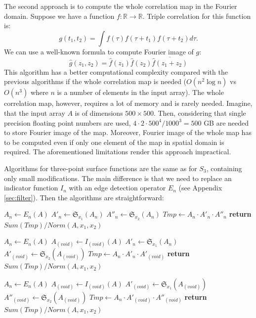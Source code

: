 \documentclass[reprint,amsmath,amssymb,aps,pre,showkeys,showpacs]{revtex4-1}
\begin{document}
The second approach is to compute the whole correlation map in the Fourier
domain. Suppose we have a function
$f: \mathbb{R} \rightarrow \mathbb{R}$. Triple correlation for this function is:
\begin{equation}
  g(t_1, t_2) = \int f(\tau) f(\tau + t_1) f(\tau + t_2) d \tau.
\end{equation}
We can use a well-known formula to compute Fourier image of $g$:
\begin{equation}
  \hat{g}(z_1, z_2) = \hat{f}(z_1) \hat{f}(z_2) \overline{\hat{f}(z_1 + z_2)}
\end{equation}
This algorithm has a better computational complexity compared with the previous
algorithms if the whole correlation map is needed ($O(n^2 \log n)$ vs
$O(n^3)$ where $n$ is a number of elements in the input array). The whole
correlation map, however, requires a lot of memory and is rarely
needed. Imagine, that the input array $A$ is of dimensions $500 \times 500$.
Then, considering that single precision floating point numbers are used,
$4 \cdot 2 \cdot 500^4 / 1000^3 = 500$ GB are needed to store Fourier image of
the map. Moreover, Fourier image of the whole map has to be computed even if only one
element of the map in spatial domain is required. The aforementioned limitations
render this approach impractical.

Algorithms for three-point surface functions are the same as for $S_3$,
containing only small modifications. The main difference is that we need to
replace an indicator function $I_n$ with an edge detection operator $E_n$
(see Appendix \ref{sec:filter}). Then the algorithms are straightforward:
\begin{algorithmic}[1]
  \State $A_n \gets E_n (A)$
  \State $A'_n \gets \mathfrak{S}_{x_1}(A_n)$
  \State $A''_n \gets \mathfrak{S}_{x_2}(A_n)$
  \State $Tmp \gets A_n \cdot A'_n \cdot A''_n$
  \State \textbf{return} $Sum(Tmp) / Norm(A, x_1, x_2)$
  \EndProcedure

  \State $A_n \gets E_n (A)$
  \State $A_{(void)} \gets I_{(void)} (A)$
  \State $A'_n \gets \mathfrak{S}_{x_1}(A_n)$
  \State $A'_{(void)} \gets \mathfrak{S}_{x_2}(A_{(void)})$
  \State $Tmp \gets A_n \cdot A'_n \cdot A'_{(void)}$
  \State \textbf{return} $Sum(Tmp) / Norm(A, x_1, x_2)$
  \EndProcedure

  \State $A_n \gets E_n (A)$
  \State $A_{(void)} \gets I_{(void)} (A)$
  \State $A'_{(void)} \gets \mathfrak{S}_{x_1}(A_{(void)})$
  \State $A''_{(void)} \gets \mathfrak{S}_{x_2}(A_{(void)})$
  \State $Tmp \gets A_n \cdot A'_{(void)} \cdot A''_{(void)}$
  \State \textbf{return} $Sum(Tmp) / Norm(A, x_1, x_2)$
  \EndProcedure
\end{algorithmic}
\end{document}
